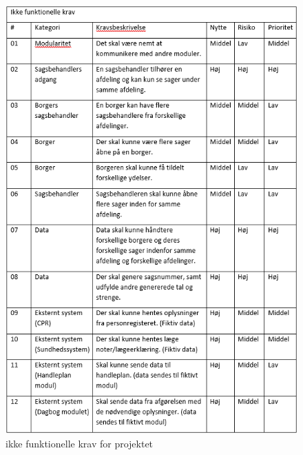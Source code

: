\begin{figure}[hbt!]
  \includegraphics[scale = 0.9]{./PNG/krav/ikkeKrav.PNG} 
  \caption{ikke funktionelle krav for projektet  }
  \label{fig:ikkeKrav}
\end{figure}